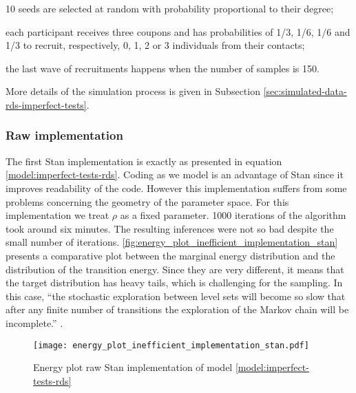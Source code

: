 \begin{alineas}
  \item 10 seeds are selected at random with probability proportional to their
  degree;
  \item each participant receives three coupons and has probabilities of 1/3,
  1/6, 1/6 and 1/3 to recruit, respectively, 0, 1, 2 or 3 individuals from their
  contacts;
  \item the last wave of recruitments happens when the number of samples
  is 150.
\end{alineas}

More details of the simulation process is given in Subsection
\ref{sec:simulated-data-rds-imperfect-tests}.

\subsubsection*{Raw implementation}

The first Stan implementation is exactly as presented in equation
\eqref{model:imperfect-tests-rds}. Coding as we model is an advantage of Stan
since it improves readability of the code. However this implementation suffers from
some problems concerning the geometry of the parameter space. For this
implementation we treat $\rho$ as a fixed parameter. 1000 iterations of the
algorithm took around six minutes. The resulting inferences were not so bad despite
the small number of iterations.
\autoref{fig:energy_plot_inefficient_implementation_stan} presents a
comparative plot between the marginal energy distribution and the distribution
of the transition energy. Since they are very different, it means that the
target distribution has heavy tails, which is challenging for the sampling. In
this case, ``the stochastic exploration between level sets will become so slow that after any finite
number of transitions the exploration of the Markov chain will be
incomplete.'' \cite[p. 44]{betancourt2017conceptual}.

\begin{figure}
  \centering
  \caption{\label{fig:energy_plot_inefficient_implementation_stan}Energy plot
    raw Stan implementation of model \eqref{model:imperfect-tests-rds}}
  \texttt{[image: energy\_plot\_inefficient\_implementation\_stan.pdf]}
\end{figure}

